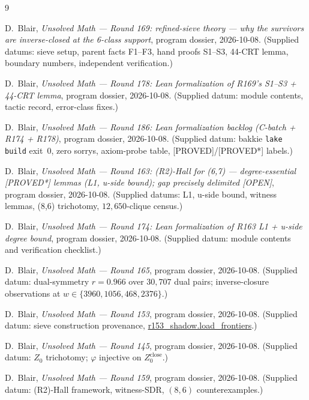 \documentclass[11pt,a4paper]{article}
\theoremstyle{definition}
\begin{document}
\begin{thebibliography}{9}

D.~Blair,
\emph{Unsolved Math --- Round 169: refined-sieve theory --- why the
survivors are inverse-closed at the 6-class support},
program dossier, 2026-10-08.
(Supplied datums: sieve setup, parent facts F1--F3, hand proofs S1--S3,
44-CRT lemma, boundary numbers, independent verification.)

D.~Blair,
\emph{Unsolved Math --- Round 178: Lean formalization of R169's S1--S3
+ 44-CRT lemma},
program dossier, 2026-10-08.
(Supplied datum: module contents, tactic record, error-class fixes.)

D.~Blair,
\emph{Unsolved Math --- Round 186: Lean formalization backlog
(C-batch + R174 + R178)},
program dossier, 2026-10-08.
(Supplied datum: bakkie \texttt{lake build} exit~0, zero sorrys,
axiom-probe table, [PROVED]/[PROVED*] labels.)

D.~Blair,
\emph{Unsolved Math --- Round 163: (R2)-Hall for (6,7) --- degree-essential
[PROVED*] lemmas (L1, u-side bound); gap precisely delimited [OPEN]},
program dossier, 2026-10-08.
(Supplied datums: L1, u-side bound, witness lemmas, (8,6) trichotomy,
$12{,}650$-clique census.)

D.~Blair,
\emph{Unsolved Math --- Round 174: Lean formalization of R163 L1 +
u-side degree bound},
program dossier, 2026-10-08.
(Supplied datum: module contents and verification checklist.)

D.~Blair,
\emph{Unsolved Math --- Round 165},
program dossier, 2026-10-08.
(Supplied datum: dual-symmetry $r=0.966$ over $30{,}707$ dual pairs;
inverse-closure observations at $w\in\{3960,1056,468,2376\}$.)

D.~Blair,
\emph{Unsolved Math --- Round 153},
program dossier, 2026-10-08.
(Supplied datum: sieve construction provenance,
\url{r153_shadow.load_frontiers}.)

D.~Blair,
\emph{Unsolved Math --- Round 145},
program dossier, 2026-10-08.
(Supplied datum: $Z_0$ trichotomy; $\varphi$ injective on
$Z_0^{\mathrm{close}}$.)

D.~Blair,
\emph{Unsolved Math --- Round 159},
program dossier, 2026-10-08.
(Supplied datum: (R2)-Hall framework, witness-SDR, $(8,6)$
counterexamples.)

\end{thebibliography}
\end{document}

